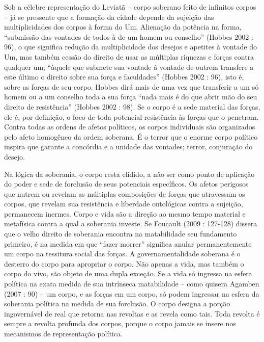 Sob a célebre representação do Leviatã -- corpo soberano feito de
infinitos corpos -- já se pressente que a formação da cidade depende da
sujeição das multiplicidades dos corpos à forma do Um. Alienação da
potência na forma, ``submissão das vontades de todos à de um homem ou
conselho'' (Hobbes 2002 : 96), o que significa redução da multiplicidade
dos desejos e apetites à vontade do Um, mas também cessão do direito de
usar as múltiplas riquezas e forças contra qualquer um; ``àquele que
submete sua vontade à vontade de outrem transfere a este último o
direito sobre sua força e faculdades'' (Hobbes 2002 : 96), isto é, sobre
as forças de seu corpo. Hobbes dirá mais de uma vez que transferir a um
só homem ou a um conselho toda a sua força ``nada mais é do que abrir
mão do seu direito de resistência'' (Hobbes 2002 : 98). Se o corpo é a
sede material das forças, ele é, por definição, o foco de toda potencial
resistência às forças que o penetram. Contra todas as ordens de afetos
políticos, os corpos individuais são organizados pelo afeto homogêneo da
ordem soberana. É o terror que o enorme corpo político inspira que
garante a concórdia e a unidade das vontades; terror, conjuração do
desejo.

Na lógica da soberania, o corpo resta elidido, a não ser como ponto de
aplicação do poder e sede de forclusão de seus potenciais específicos.
Os afetos perigosos que nutrem ou revelam as múltiplas composições de
forças que atravessam os corpos, que revelam sua resistência e liberdade
ontológicas contra a sujeição, permanecem inermes. Corpo e vida são a
direção ao mesmo tempo material e metafísica contra a qual a soberania
investe. Se Foucault (2009 : 127-128) dissera que o velho direito de
soberania encontra na matabilidade seu fundamento primeiro, é na medida
em que ``fazer morrer'' significa anular permanentemente um corpo na
tessitura social das forças. A governamentalidade soberana é o desterro
do corpo para apropriar o corpo. Não apenas a vida, mas também o corpo
do vivo, são objeto de uma dupla exceção. Se a vida só ingressa na
esfera política na exata medida de sua intrínseca matabilidade -- como
quisera Agamben (2007 : 90) -- um corpo, e as forças em um corpo, só
podem ingressar na esfera da soberania política na medida de sua
forclusão. O corpo designa a porção ingovernável de real que retorna nas
revoltas e as revela como tais. Toda revolta é sempre a revolta profunda
dos corpos, porque o corpo jamais se insere nos mecanismos de
representação política.

